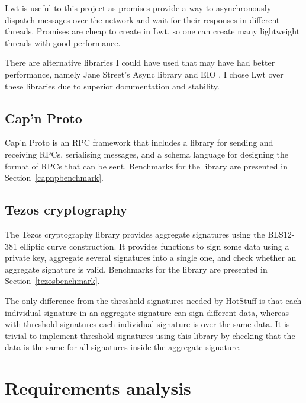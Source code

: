 Lwt is useful to this project as promises provide a way to asynchronously dispatch messages over the network and wait for their responses in different threads. Promises are cheap to create in Lwt, so one can create many lightweight threads with good performance.

There are alternative libraries I could have used that may have had better performance, namely Jane Street's Async library \cite{async} and EIO \cite{eio}. I chose Lwt over these libraries due to superior documentation and stability.

\subsection{Cap'n Proto}
Cap'n Proto \cite{capnp} is an RPC framework that includes a library for sending and receiving RPCs, serialising messages, and a schema language for designing the format of RPCs that can be sent. Benchmarks for the library are presented in Section~\ref{capnpbenchmark}.

\subsection{Tezos cryptography} \label{tezos}
The Tezos cryptography library \cite{tezosCrypto} provides aggregate signatures using the BLS12-381 elliptic curve construction. It provides functions to sign some data using a private key, aggregate several signatures into a single one, and check whether an aggregate signature is valid. Benchmarks for the library are presented in Section~\ref{tezosbenchmark}.

The only difference from the threshold signatures needed by HotStuff is that each individual signature in an aggregate signature can sign different data, whereas with threshold signatures each individual signature is over the same data. It is trivial to implement threshold signatures using this library by checking that the data is the same for all signatures inside the aggregate signature.

\section{Requirements analysis} \label{requirements}

